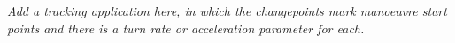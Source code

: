 \documentclass[journal]{IEEEtran}
\newenvironment{meta}[0]{\color{red} \em}{}
\begin{document}
\begin{meta}
Add a tracking application here, in which the changepoints mark manoeuvre start points and there is a turn rate or acceleration parameter for each.
\end{meta}


%
%



%
%
\end{document}
